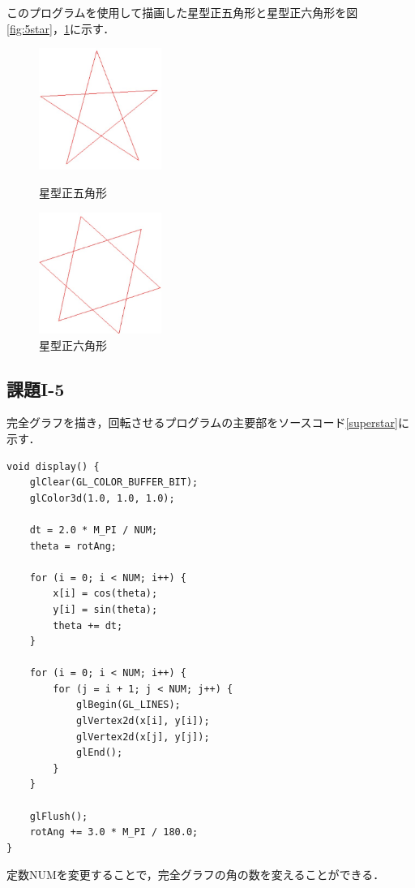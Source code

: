 \documentclass[]{jsarticle}
\begin{document}
このプログラムを使用して描画した星型正五角形と星型正六角形を図\ref{fig:5star}，\ref{fig:6star}に示す．
\begin{figure}[htbp]
\begin{center}
\begin{minipage}[b]{0.45\textwidth}
  \begin{center}
    \includegraphics[width=4cm,keepaspectratio]{5star.jpg}
    \caption{星型正五角形}
    \label{fig:5star}
  \end{center}
\end{minipage}
\begin{minipage}[b]{0.45\textwidth}
  \begin{center}
    \includegraphics[width=4cm,keepaspectratio]{6star.jpg}
    \caption{星型正六角形}
    \label{fig:6star}
  \end{center}
\end{minipage}
\end{center}
\end{figure}
\subsection{課題I-5}
完全グラフを描き，回転させるプログラムの主要部をソースコード\ref{superstar}に示す．
\begin{lstlisting}[caption=完全グラフの描画と回転,label=superstar]
void display() {
    glClear(GL_COLOR_BUFFER_BIT);
    glColor3d(1.0, 1.0, 1.0);

    dt = 2.0 * M_PI / NUM;
    theta = rotAng;

    for (i = 0; i < NUM; i++) {
        x[i] = cos(theta);
        y[i] = sin(theta);
        theta += dt;
    }

    for (i = 0; i < NUM; i++) {
        for (j = i + 1; j < NUM; j++) {
            glBegin(GL_LINES);
            glVertex2d(x[i], y[i]);
            glVertex2d(x[j], y[j]);
            glEnd();
        }
    }

    glFlush();
    rotAng += 3.0 * M_PI / 180.0;
}
\end{lstlisting}
定数NUMを変更することで，完全グラフの角の数を変えることができる．
\end{document}
